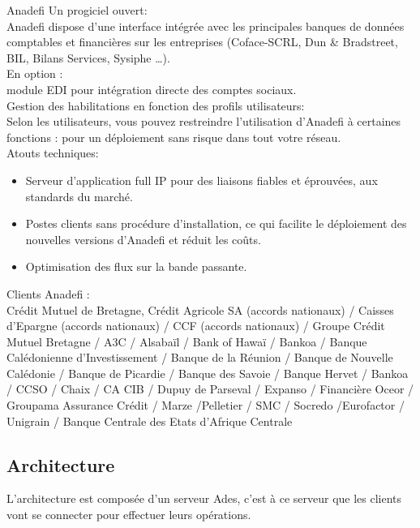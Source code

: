 {\large{Anadefi Un progiciel ouvert:\\}}
Anadefi dispose d’une interface intégrée avec les principales banques de données comptables et financières sur les entreprises (Coface-SCRL, Dun \& Bradstreet, BIL, Bilans Services, Sysiphe …).\\

{\large{En option :\\}}
module EDI pour intégration directe des comptes sociaux.\\

{\large{Gestion des habilitations en fonction des profils utilisateurs:\\}}
Selon les utilisateurs, vous pouvez restreindre l’utilisation d’Anadefi à certaines fonctions : pour un déploiement sans risque dans tout votre réseau.\\

{\large{Atouts techniques:}}
\begin{itemize}
\item Serveur d’application full IP pour des liaisons fiables et éprouvées, aux standards du marché.
\item Postes clients sans procédure d’installation, ce qui facilite le déploiement des nouvelles versions d’Anadefi et réduit les coûts.
\item Optimisation des flux sur la bande passante.\\
\end{itemize}

\newpage

{\large{Clients Anadefi :}}\\
Crédit Mutuel de Bretagne, Crédit Agricole SA (accords nationaux) / Caisses d’Epargne (accords nationaux) / CCF (accords nationaux) / Groupe Crédit Mutuel Bretagne / A3C / Alsabaïl / Bank of Hawaï / Bankoa / Banque Calédonienne d’Investissement / Banque de la Réunion / Banque de Nouvelle Calédonie / Banque de Picardie / Banque des Savoie / Banque Hervet / Bankoa / CCSO / Chaix / CA CIB / Dupuy de Parseval / Expanso / Financière Oceor / Groupama Assurance Crédit / Marze /Pelletier / SMC / Socredo /Eurofactor / Unigrain / Banque Centrale des Etats d’Afrique Centrale


\subsection{Architecture}

L'architecture est composée d'un serveur Ades, c'est à ce serveur que les clients vont se connecter pour effectuer leurs opérations.\\


